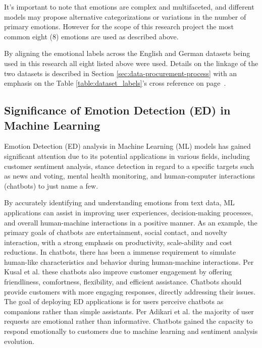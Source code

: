 \documentclass[11pt]{article}
\begin{document}
It's important to note that emotions are complex and multifaceted, and different models may propose alternative categorizations or variations in the number of primary emotions. However for the scope of this research project the most common eight (8) emotions are used as described above.

By aligning the emotional labels across the English \cite{english-dataset-twitter} and German \cite{german-dataset-cheese} datasets being used in this research all eight listed above were used. Details on the linkage of the two datasets is described in Section \ref{sec:data-procurement-process} with an emphasis on the Table \ref{table:dataset_labels}'s cross reference on page~\pageref{table:dataset_labels}.

\subsection{Significance of Emotion Detection (ED) in Machine Learning}
Emotion Detection (ED) analysis in Machine Learning (ML) models has gained significant attention due to its potential applications in various fields, including customer sentiment analysis, stance detection in regard to a specific targets such as news and voting\cite{mascarell-etal-2021-stance}, mental health monitoring\cite{Colonnello}, and human-computer interactions (chatbots\cite{chatbot-cognitive-awareness}) to just name a few.

By accurately identifying and understanding emotions from text data, ML applications can assist in improving user experiences, decision-making processes, and overall human-machine interactions in a positive manner\cite{Colonnello, mascarell-etal-2021-stance}. As an example, the primary goals of chatbots are entertainment, social contact, and novelty interaction, with a strong emphasis on productivity, scale-ability and cost reductions. In chatbots, there has been a immense requirement to simulate human-like characteristics and behavior during human-machine interactions\cite{emotion-detection-literature-review}. Per Kusal et al. \cite{chatbot-cognitive-awareness} these chatbots also improve customer engagement by offering friendliness, comfortness, flexibility, and efficient assistance. Chatbots should provide customers with more engaging responses, directly addressing their issues. The goal of deploying ED applications is for users perceive chatbots as companions rather than simple assistants. Per Adikari et al. the majority of user requests are emotional rather than informative. Chatbots gained the capacity to respond emotionally to customers due to machine learning and sentiment analysis evolution\cite{chatbot-cognitive-awareness}.
\end{document}
